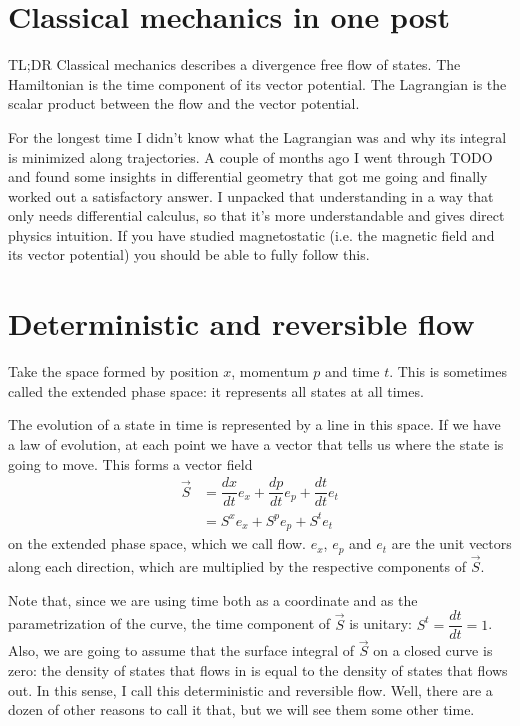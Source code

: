 \documentclass[aps,pra,10pt,floatfix,nofootinbib]{revtex4-1}
\theoremstyle{definition}
\begin{document}
	
\section{Classical mechanics in one post}

TL;DR Classical mechanics describes a divergence free flow of states. The Hamiltonian is the time component of its vector potential. The Lagrangian is the scalar product between the flow and the vector potential.

For the longest time I didn't know what the Lagrangian was and why its integral is minimized along trajectories. A couple of months ago I went through TODO and found some insights in differential geometry that got me going and finally worked out a satisfactory answer. I unpacked that understanding in a way that only needs differential calculus, so that it's more understandable and gives direct physics intuition. If you have studied magnetostatic (i.e. the magnetic field and its vector potential) you should be able to fully follow this.

\section{Deterministic and reversible flow}

Take the space formed by position $x$, momentum $p$ and time $t$. This is sometimes called the extended phase space: it represents all states at all times.

The evolution of a state in time is represented by a line in this space. If we have a law of evolution, at each point we have a vector that tells us where the state is going to move. This forms a vector field
\begin{equation}
\begin{aligned}
\vec{S} &= \dfrac{dx}{dt} e_x + \dfrac{dp}{dt} e_p + \dfrac{dt}{dt} e_t \\ 
&= S^x e_x + S^p e_p + S^t e_t 
\end{aligned}
\label{flow}
\end{equation}
 on the extended phase space, which we call flow. $e_x$, $e_p$ and $e_t$ are the unit vectors along each direction, which are multiplied by the respective components of $\vec{S}$.

Note that, since we are using time both as a coordinate and as the parametrization of the curve, the time component of $\vec{S}$ is unitary: $S^t = \dfrac{dt}{dt} = 1$. Also, we are going to assume that the surface integral of $\vec{S}$ on a closed curve is zero: the density of states that flows in is equal to the density of states that flows out. In this sense, I call this deterministic and reversible flow. Well, there are a dozen of other reasons to call it that, but we will see them some other time.
\end{document}
